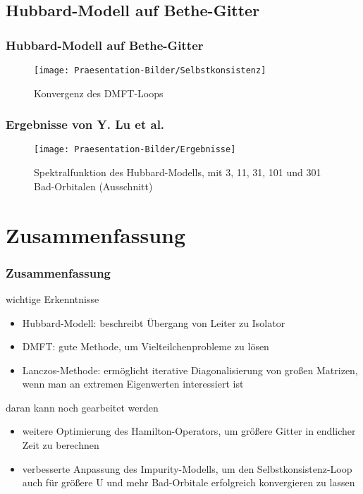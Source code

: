 \documentclass{beamer}
\begin{document}
\subsection{Hubbard-Modell auf Bethe-Gitter}
\begin{frame}
\frametitle{Hubbard-Modell auf Bethe-Gitter}
\begin{figure}
	\centering
	\texttt{[image: Praesentation-Bilder/Selbstkonsistenz]}
	\caption{Konvergenz des DMFT-Loops}
	\label{fig:selbstkonsistenz}
\end{figure}

\end{frame}

\begin{frame}
\frametitle{Ergebnisse von Y. Lu et al.}
\begin{figure}
	\centering
	\texttt{[image: Praesentation-Bilder/Ergebnisse]}
	\caption{Spektralfunktion des Hubbard-Modells, mit 3, 11, 31, 101 und 301 Bad-Orbitalen \cite{Lu} (Ausschnitt)}
	\label{fig:ergebnisse}
\end{figure}

\end{frame}

\section[Zusammen-\\fassung]{Zusammenfassung}
\begin{frame}
\frametitle{Zusammenfassung}
\begin{block}{wichtige Erkenntnisse}
\begin{itemize}
\item Hubbard-Modell: beschreibt Übergang von Leiter zu Isolator
\item DMFT: gute Methode, um Vielteilchenprobleme zu lösen
\item Lanczos-Methode: ermöglicht iterative Diagonalisierung von großen Matrizen, wenn man an extremen Eigenwerten interessiert ist
\end{itemize}
\end{block}

\begin{block}{daran kann noch gearbeitet werden}
	\begin{itemize}
		\item weitere Optimierung des Hamilton-Operators, um größere Gitter in endlicher Zeit zu berechnen
		\item verbesserte Anpassung des Impurity-Modells, um den Selbstkonsistenz-Loop auch für größere U und mehr Bad-Orbitale erfolgreich konvergieren zu lassen
	\end{itemize}
\end{block}
\end{frame}
\end{document}
